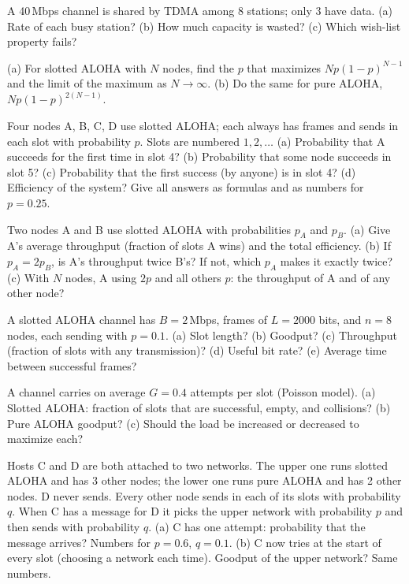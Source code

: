 A 40\,Mbps channel is shared by TDMA among 8 stations; only 3 have data. (a) Rate of each busy station? (b) How much capacity is wasted? (c) Which wish-list property fails?

(a) For slotted ALOHA with $N$ nodes, find the $p$ that maximizes $Np(1-p)^{N-1}$ and the limit of the maximum as $N\to\infty$.
(b) Do the same for pure ALOHA, $Np(1-p)^{2(N-1)}$.

Four nodes A, B, C, D use slotted ALOHA; each always has frames and sends in each slot with probability $p$. Slots are numbered $1,2,\dots$
(a) Probability that A succeeds for the first time in slot 4?
(b) Probability that some node succeeds in slot 5?
(c) Probability that the first success (by anyone) is in slot 4?
(d) Efficiency of the system? Give all answers as formulas and as numbers for $p=0.25$.

Two nodes A and B use slotted ALOHA with probabilities $p_A$ and $p_B$.
(a) Give A's average throughput (fraction of slots A wins) and the total efficiency.
(b) If $p_A=2p_B$, is A's throughput twice B's? If not, which $p_A$ makes it exactly twice?
(c) With $N$ nodes, A using $2p$ and all others $p$: the throughput of A and of any other node?

A slotted ALOHA channel has $B=2$\,Mbps, frames of $L=2000$ bits, and $n=8$ nodes, each sending with $p=0.1$.
(a) Slot length? (b) Goodput? (c) Throughput (fraction of slots with any transmission)? (d) Useful bit rate? (e) Average time between successful frames?

A channel carries on average $G=0.4$ attempts per slot (Poisson model).
(a) Slotted ALOHA: fraction of slots that are successful, empty, and collisions? (b) Pure ALOHA goodput? (c) Should the load be increased or decreased to maximize each?

Hosts C and D are both attached to two networks. The upper one runs slotted ALOHA and has 3 other nodes; the lower one runs pure ALOHA and has 2 other nodes. D never sends.
Every other node sends in each of its slots with probability $q$. When C has a message for D it picks the upper network with probability $p$ and then sends with probability $q$.
(a) C has one attempt: probability that the message arrives? Numbers for $p=0.6$, $q=0.1$.
(b) C now tries at the start of every slot (choosing a network each time). Goodput of the upper network? Same numbers.

